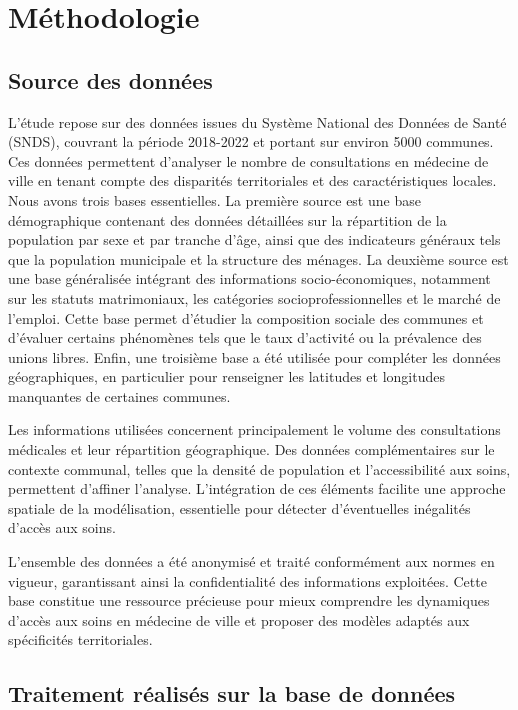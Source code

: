 \documentclass[
]{article}
\author{}
\date{\vspace{-2.5em}}
\begin{document}
\section{Méthodologie}\label{muxe9thodologie}

\subsection{Source des données}\label{source-des-donnuxe9es}

L'étude repose sur des données issues du Système National des Données de
Santé (SNDS), couvrant la période 2018-2022 et portant sur environ 5000
communes. Ces données permettent d'analyser le nombre de consultations
en médecine de ville en tenant compte des disparités territoriales et
des caractéristiques locales. Nous avons trois bases essentielles. La
première source est une base démographique contenant des données
détaillées sur la répartition de la population par sexe et par tranche
d'âge, ainsi que des indicateurs généraux tels que la population
municipale et la structure des ménages. La deuxième source est une base
généralisée intégrant des informations socio-économiques, notamment sur
les statuts matrimoniaux, les catégories socioprofessionnelles et le
marché de l'emploi. Cette base permet d'étudier la composition sociale
des communes et d'évaluer certains phénomènes tels que le taux
d'activité ou la prévalence des unions libres. Enfin, une troisième base
a été utilisée pour compléter les données géographiques, en particulier
pour renseigner les latitudes et longitudes manquantes de certaines
communes.

Les informations utilisées concernent principalement le volume des
consultations médicales et leur répartition géographique. Des données
complémentaires sur le contexte communal, telles que la densité de
population et l'accessibilité aux soins, permettent d'affiner l'analyse.
L'intégration de ces éléments facilite une approche spatiale de la
modélisation, essentielle pour détecter d'éventuelles inégalités d'accès
aux soins.

L'ensemble des données a été anonymisé et traité conformément aux normes
en vigueur, garantissant ainsi la confidentialité des informations
exploitées. Cette base constitue une ressource précieuse pour mieux
comprendre les dynamiques d'accès aux soins en médecine de ville et
proposer des modèles adaptés aux spécificités territoriales.

\subsection{Traitement réalisés sur la base de
données}\label{traitement-ruxe9alisuxe9s-sur-la-base-de-donnuxe9es}
\end{document}
